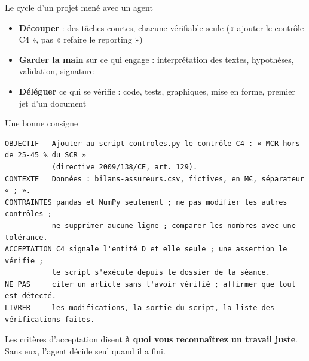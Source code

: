 \documentclass[10pt,aspectratio=169]{beamer}
\begin{document}
\begin{frame}{Le cycle d'un projet mené avec un agent}
\begin{center}
\end{center}
\vspace{0.2cm}
\begin{itemize}
  \item \textbf{Découper} : des tâches courtes, chacune vérifiable seule (« ajouter le contrôle C4 », pas « refaire le reporting »)
  \item \textbf{Garder la main} sur ce qui engage : interprétation des textes, hypothèses, validation, signature
  \item \textbf{Déléguer} ce qui se vérifie : code, tests, graphiques, mise en forme, premier jet d'un document
\end{itemize}
\end{frame}

\begin{frame}[fragile]{Une bonne consigne}
\begin{lstlisting}[language={},basicstyle=\ttfamily\scriptsize]
OBJECTIF   Ajouter au script controles.py le contrôle C4 : « MCR hors de 25-45 % du SCR »
           (directive 2009/138/CE, art. 129).
CONTEXTE   Données : bilans-assureurs.csv, fictives, en M€, séparateur « ; ».
CONTRAINTES pandas et NumPy seulement ; ne pas modifier les autres contrôles ;
           ne supprimer aucune ligne ; comparer les nombres avec une tolérance.
ACCEPTATION C4 signale l'entité D et elle seule ; une assertion le vérifie ;
           le script s'exécute depuis le dossier de la séance.
NE PAS     citer un article sans l'avoir vérifié ; affirmer que tout est détecté.
LIVRER     les modifications, la sortie du script, la liste des vérifications faites.
\end{lstlisting}
\small Les critères d'acceptation disent \textbf{à quoi vous reconnaîtrez un travail juste}. Sans
eux, l'agent décide seul quand il a fini.
\end{frame}
\end{document}
